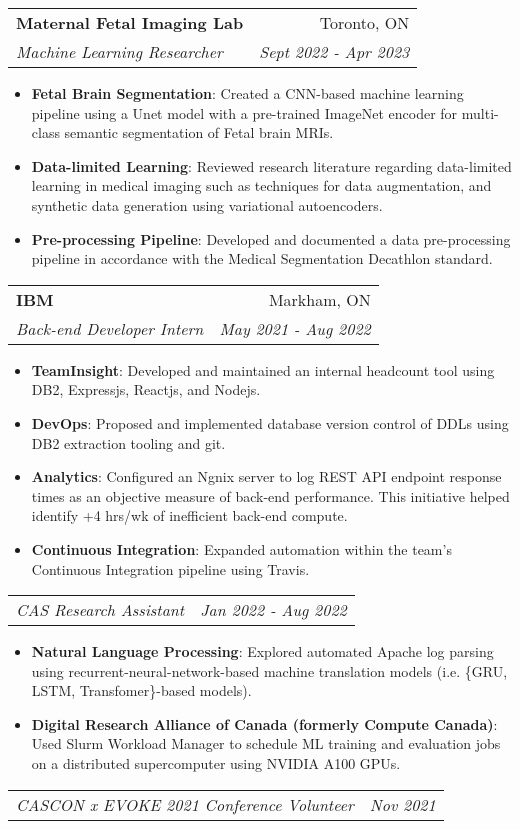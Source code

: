 \documentclass[letterpaper,11pt]{article}
\makeatletter
\newcommand{\resumeItem}[2]{
  \item\small{
    \textbf{#1}{: #2\vspace{-2pt}}
  }
}
\newcommand{\resumeSubheading}[4]{
  \vspace{-1pt}\item
    \begin{tabular*}{0.97\textwidth}[t]{l@{\extracolsep{\fill}}r}
      \textbf{\large#1} & #2 \\
      \textit{\small#3} & \textit{\small #4} \\
    \end{tabular*}\vspace{-5pt}
}
\newcommand{\resumeSubSubheading}[2]{
    \begin{tabular*}{0.97\textwidth}{l@{\extracolsep{\fill}}r}
      \textit{\small#1} & \textit{\small #2} \\
    \end{tabular*}\vspace{-5pt}
}
\newcommand{\resumeItemListStart}{\begin{itemize}}
\newcommand{\resumeItemListEnd}{\end{itemize}\vspace{-5pt}}
\makeatother
\begin{document}
	\resumeSubheading
	{Maternal Fetal Imaging Lab}{Toronto, ON}
	{Machine Learning Researcher}{Sept 2022 - Apr 2023}
	\resumeItemListStart
	\resumeItem{Fetal Brain Segmentation}
	{Created a CNN-based machine learning pipeline using a Unet model with a pre-trained ImageNet encoder for multi-class semantic segmentation of Fetal brain MRIs.}
	\resumeItem{Data-limited Learning}
	{Reviewed research literature regarding data-limited learning in medical imaging such as techniques for data augmentation, and synthetic data generation using variational autoencoders.}
	\resumeItem{Pre-processing Pipeline}
	{Developed and documented a data pre-processing pipeline in accordance with the Medical Segmentation Decathlon standard.}
	\resumeItemListEnd
	
    \resumeSubheading
      {IBM}{Markham, ON}
      {Back-end Developer Intern}{May 2021 - Aug 2022}
      \resumeItemListStart
        \resumeItem{TeamInsight}
          {Developed and maintained an internal headcount tool using DB2, Expressjs, Reactjs, and Nodejs.}
        \resumeItem{DevOps}
          {Proposed and implemented database version control of DDLs using DB2 extraction tooling and git.}
        \resumeItem{Analytics}
          {Configured an Ngnix server to log REST API endpoint response times as an objective measure of back-end performance. This initiative helped identify +4 hrs/wk of inefficient back-end compute.}
      	\resumeItem{Continuous Integration}
     	  {Expanded automation within the team's Continuous Integration pipeline using Travis.}
      \resumeItemListEnd
      \resumeSubSubheading
		{CAS Research Assistant}{Jan 2022 - Aug 2022}
		\resumeItemListStart
		\resumeItem{Natural Language Processing}
		{Explored automated Apache log parsing using recurrent-neural-network-based machine translation models (i.e. \{GRU, LSTM, Transfomer\}-based models).}
		\resumeItem{Digital Research Alliance of Canada (formerly Compute Canada)}
		{Used Slurm Workload Manager to schedule ML training and evaluation jobs on a distributed supercomputer using NVIDIA A100 GPUs.}
		\resumeItemListEnd
      \resumeSubSubheading
		{CASCON x EVOKE 2021 Conference Volunteer}{Nov 2021}
      
\end{document}

